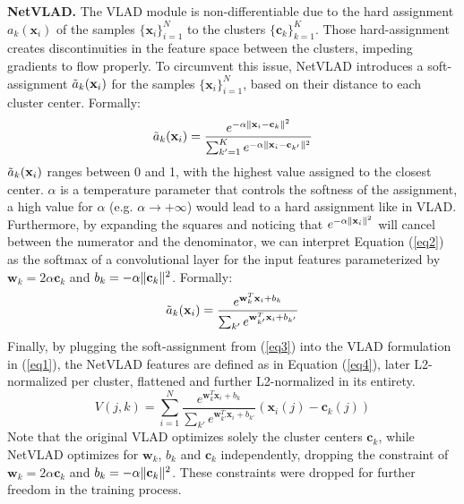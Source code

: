 \documentclass{article}
\DeclarePairedDelimiter\norm{\lVert}{\rVert}
\begin{document}
\textbf{NetVLAD.} The VLAD module is non-differentiable due to
the hard assignment $a_k(\mathrm{\mathbf{x}}_i)$ of the samples $\{\mathrm{\mathbf{x}}_i\}_{i=1}^N$ to the clusters $\{\mathrm{\mathbf{c}}_k\}_{k=1}^K$. Those hard-assignment creates discontinuities in the feature space between the clusters, impeding gradients to flow properly. To circumvent this issue, NetVLAD \cite{netvlad} introduces a soft-assignment $\Tilde{a}_k(\mathrm{\mathbf{x}}_i)$ for the samples $\{\mathrm{\mathbf{x}}_i\}_{i=1}^N$, based on their distance to each cluster center. Formally:
\begin{equation}
\label{eq2}
    \Tilde{a}_k(\mathrm{\mathbf{x}}_i) = \frac{e^{-\alpha\norm{\mathrm{\mathbf{x}}_i - \mathrm{\mathbf{c}}_k}^2}}{\sum_{k'=1}^Ke^{-\alpha\norm{\mathrm{\mathbf{x}}_i - \mathrm{\mathbf{c}}_{k'}}^2}}
\end{equation}
$\Tilde{a}_k(\mathrm{\mathbf{x}}_i)$ ranges between 0 and 1,  with the highest value assigned to the closest center. $\alpha$ is a temperature parameter that controls the softness of the assignment, a high value for $\alpha$ (e.g. $\alpha\to+\infty$) would lead to a hard assignment like in VLAD. Furthermore, by expanding the squares and noticing that $e^{-\alpha\norm{\mathrm{\mathbf{x}}_i}^2}$ will cancel between the numerator and the
denominator, we can interpret Equation (\ref{eq2}) as the softmax of a convolutional layer for the input features parameterized by $\mathrm{\mathbf{w}}_k=2\alpha\mathrm{\mathbf{c}}_k$ and $b_k = -\alpha \norm{\mathrm{\mathbf{c}}_k}^2$. Formally:
\begin{equation}
\label{eq3}
    \Tilde{a}_k(\mathrm{\mathbf{x}}_i) = \frac{e^{\mathrm{\mathbf{w}}_k^T\mathrm{\mathbf{x}}_i + b_k}}{\sum_{k'}e^{\mathrm{\mathbf{w}}_{k'}^T\mathrm{\mathbf{x}}_i + b_{k'}}}
\end{equation}
Finally, by plugging the soft-assignment from (\ref{eq3}) into the VLAD formulation in (\ref{eq1}), the NetVLAD features are defined as in Equation (\ref{eq4}), later L2-normalized per cluster, flattened and further L2-normalized in its entirety.
\begin{equation}
\label{eq4}
    V(j, k) = \sum_{i=1}^N \frac{e^{\mathrm{\mathbf{w}}_k^T\mathrm{\mathbf{x}}_i + b_k}}{\sum_{k'}e^{\mathrm{\mathbf{w}}_{k'}^T\mathrm{\mathbf{x}}_i + b_{k'}}} (\mathrm{\mathbf{x}}_i(j) - \mathrm{\mathbf{c}}_k(j))
\end{equation}
Note that the original VLAD optimizes solely the cluster centers $\mathrm{\mathbf{c}}_k$, while NetVLAD optimizes for $\mathrm{\mathbf{w}}_k$, $b_k$ and $\mathrm{\mathbf{c}}_k$ independently, dropping the constraint of $\mathrm{\mathbf{w}}_k=2\alpha\mathrm{\mathbf{c}}_k$ and $b_k = -\alpha \norm{\mathrm{\mathbf{c}}_k}^2$. These constraints were dropped for further freedom in the training process.
\end{document}
